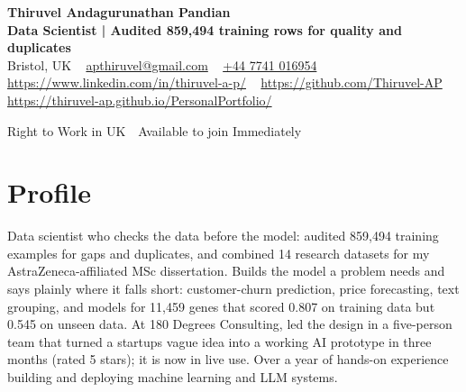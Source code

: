 \documentclass[a4paper,11pt]{article}
\newcommand{\num}[1]{\textbf{#1}}   %
\begin{document}
\begin{center}
  {\LARGE\bfseries Thiruvel Andagurunathan Pandian} \\[3pt]
  {\color{headernavy}\small\textbf{Data Scientist | Audited \num{859,494} training rows for quality and duplicates}} \\[3pt]
  {\small
  Bristol, UK\nobreak\ \,\textbar\, \href{mailto:apthiruvel@gmail.com}{apthiruvel@gmail.com}\nobreak\ \,\textbar\, \href{tel:+447741016954}{+44 7741 016954}\nobreak\ \,\textbar\, \href{https://www.linkedin.com/in/thiruvel-a-p/}{https://www.linkedin.com/in/thiruvel-a-p/}\nobreak\ \,\textbar\, \href{https://github.com/Thiruvel-AP}{https://github.com/Thiruvel-AP}\nobreak\ \,\textbar\, \href{https://thiruvel-ap.github.io/PersonalPortfolio/}{https://thiruvel-ap.github.io/PersonalPortfolio/}}\par\vspace{4pt}
  \noindent{} Right to Work in UK \,\textbar\, Available to join Immediately
\end{center}

\section{Profile}
Data scientist who checks the data before the model: audited 859,494 training examples for gaps and duplicates, and combined 14 research datasets for my AstraZeneca-affiliated MSc dissertation. Builds the model a problem needs and says plainly where it falls short: customer-churn prediction, price forecasting, text grouping, and models for 11,459 genes that scored 0.807 on training data but 0.545 on unseen data. At 180 Degrees Consulting, led the design in a five-person team that turned a startup\textquotesingle{}s vague idea into a working AI prototype in three months (rated 5 stars); it is now in live use. Over a year of hands-on experience building and deploying machine learning and LLM systems.
\end{document}
